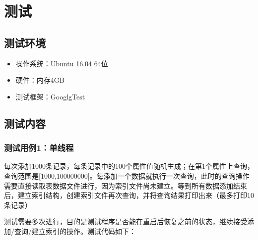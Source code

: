 \documentclass[bachelor]{thesis-uestc}
\begin{document}
\chapter{测试}
\section{测试环境}
\begin{itemize}
	\item 操作系统：Ubuntu 16.04 64位
	\item 硬件：内存4GB
	\item 测试框架：GooglgTest
\end{itemize}

\section{测试内容}
\subsection{测试用例1：单线程}
每次添加1000条记录，每条记录中的100个属性值随机生成；在第1个属性上查询，查询范围是[1000,100000000]。每添加一个数据就执行一次查询，此时的查询操作需要直接读取表数据文件进行，因为索引文件尚未建立。等到所有数据添加结束后，建立索引结构，创建索引文件再次查询，并将查询结果打印出来（最多打印10条记录）\par
测试需要多次进行，目的是测试程序是否能在重启后恢复之前的状态，继续接受添加/查询/建立索引的操作。测试代码如下：
\end{document}
